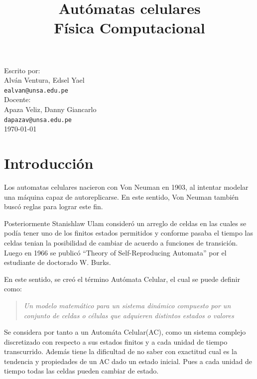 \documentclass[a4paper,12pt]{article}
\begin{document}
    
\lstset{language=Python,frame=single, firstnumber=1,basicstyle=\footnotesize,
numbers=left,showspaces=false,showstringspaces=false}   
    \title{Autómatas celulares\\Física Computacional}
    \date{\vspace{-5ex}}
    \maketitle
    \begin{center}
        Escrito por:\\
        Alván Ventura, Edsel Yael\\ \texttt{ealvan@unsa.edu.pe}
        \\[3mm]
        Docente:\\Apaza Veliz, Danny Giancarlo\\ \texttt{dapazav@unsa.edu.pe}\\[3mm]
        \today
    \end{center}
    \enlargethispage{\baselineskip}

\section{Introducción}
Los automatas celulares nacieron con Von Neuman\cite{cita1} en 1903, al
intentar modelar una máquina capaz de autoreplicarse. 
En este sentido, Von Neuman también buscó reglas para 
lograr este fin. 

Posteriormente Stanishlaw Ulam\cite{cita1} consideró
un arreglo de celdas en las cuales se podía tener
uno de los finitos estados permitidos y conforme pasaba el tiempo
las celdas tenian la posibilidad de cambiar de acuerdo a
funciones de transición. Luego en 1966 se publicó ``Theory of Self-Reproducing Automata''
por el estudiante de doctorado W. Burks.

En este sentido, se creó el término Autómata Celular, el cual se puede definir como\cite{cita2}:
\begin{quotation}
    \centering
    \emph{Un modelo matemático para un sistema dinámico compuesto por un conjunto de celdas o células que adquieren distintos estados o valores}
\end{quotation}
Se considera por tanto a un Automáta Celular(AC), como un sistema complejo discretizado
con respecto a sus estados finitos y a cada unidad de tiempo transcurrido. 
Además tiene la dificultad de no saber con exactitud
cual es la tendencia y propiedades de un AC dado un estado inicial. 
Pues a cada unidad de tiempo todas las celdas pueden cambiar de estado.
\end{document}
